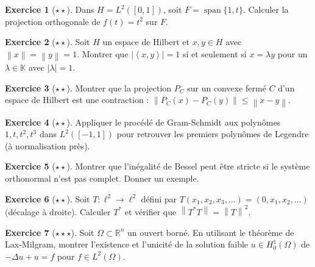 \documentclass[a4paper,12pt]{book}
\DeclareMathOperator{\spn}{span}
\newcommand{\R}{\mathbb{R}}
\newcommand{\K}{\mathbb{K}}
\newcommand{\norm}[1]{\left\| #1 \right\|}
\newcommand{\abs}[1]{\left| #1 \right|}
\newcommand{\inner}[2]{\left\langle #1, #2 \right\rangle}
\theoremstyle{definition}
\newtheorem{exercice}{Exercice}[chapter]
\theoremstyle{plain}
\theoremstyle{remark}
\begin{document}
\begin{exercice}[$\star\star$]\label{exo:ch2-proj-calcul}
Dans $H = L^2([0,1])$, soit $F = \spn\{1, t\}$. Calculer la projection orthogonale de $f(t) = t^2$ sur $F$.
\end{exercice}

\begin{exercice}[$\star\star$]\label{exo:ch2-cs-egalite}
Soit $H$ un espace de Hilbert et $x, y \in H$ avec $\norm{x} = \norm{y} = 1$. Montrer que $\abs{\inner{x}{y}} = 1$ si et seulement si $x = \lambda y$ pour un $\lambda \in \K$ avec $\abs{\lambda} = 1$.
\end{exercice}

\begin{exercice}[$\star\star$]\label{exo:ch2-proj-contraction}
Montrer que la projection $P_C$ sur un convexe fermé $C$ d'un espace de Hilbert est une contraction : $\norm{P_C(x) - P_C(y)} \leq \norm{x - y}$.
\end{exercice}

\begin{exercice}[$\star\star$]\label{exo:ch2-gram-schmidt}
Appliquer le procédé de Gram-Schmidt aux polynômes $1, t, t^2, t^3$ dans $L^2([-1,1])$ pour retrouver les premiers polynômes de Legendre (à normalisation près).
\end{exercice}

\begin{exercice}[$\star\star$]\label{exo:ch2-bessel-optimal}
Montrer que l'inégalité de Bessel peut être stricte si le système orthonormal n'est pas complet. Donner un exemple.
\end{exercice}

\begin{exercice}[$\star\star$]\label{exo:ch2-adjoint-calcul}
Soit $T : \ell^2 \to \ell^2$ défini par $T(x_1, x_2, x_3, \ldots) = (0, x_1, x_2, \ldots)$ (décalage à droite). Calculer $T^*$ et vérifier que $\norm{T^*T} = \norm{T}^2$.
\end{exercice}

\begin{exercice}[$\star\star\star$]\label{exo:ch2-lax-milgram-app}
Soit $\Omega \subset \R^n$ un ouvert borné. En utilisant le théorème de Lax-Milgram, montrer l'existence et l'unicité de la solution faible $u \in H^1_0(\Omega)$ de $-\Delta u + u = f$ pour $f \in L^2(\Omega)$.
\end{exercice}
\end{document}
